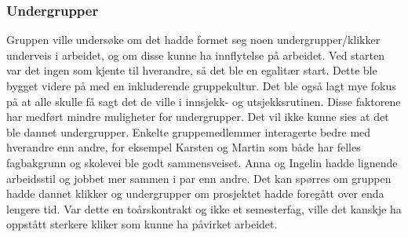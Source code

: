 \subsubsection{Undergrupper}

Gruppen ville undersøke om det hadde formet seg noen undergrupper/klikker underveis i arbeidet, og om disse kunne ha innflytelse på arbeidet.
Ved starten var det ingen som kjente til hverandre, så det ble en egalitær start.
Dette ble bygget videre på med en inkluderende gruppekultur. Det ble også lagt mye fokus på at alle skulle få sagt det de ville i innsjekk- og utsjekksrutinen. 
Disse faktorene har medført mindre muligheter for undergrupper. 
Det vil ikke kunne sies at det ble dannet undergrupper. 
Enkelte gruppemedlemmer interagerte bedre med hverandre enn andre, for eksempel Karsten og Martin som både har felles fagbakgrunn og skolevei ble godt sammensveiset. Anna og Ingelin hadde lignende arbeidsstil og jobbet mer sammen i par enn andre. 
Det kan spørres om gruppen hadde dannet klikker og undergrupper om prosjektet hadde foregått over enda lengere tid.
Var dette en toårskontrakt og ikke et semesterfag, ville det kanskje ha oppstått sterkere kliker som kunne ha påvirket arbeidet. 
